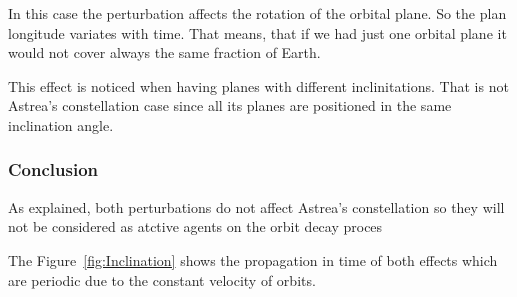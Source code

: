 In this case the perturbation affects the rotation of the orbital plane. So the plan longitude variates with time. That means, that if we had just one orbital plane it would not cover always the same fraction of Earth.

This effect is noticed when having planes with different inclinitations. That is not Astrea's constellation case since all its planes are positioned in the same inclination angle.


\subsubsection{Conclusion}

As explained, both perturbations do not affect Astrea's constellation so they will not be considered as atctive agents on the orbit decay proces

The Figure~\ref{fig:Inclination} shows the propagation in time of both effects which are periodic due to the constant velocity  of orbits.